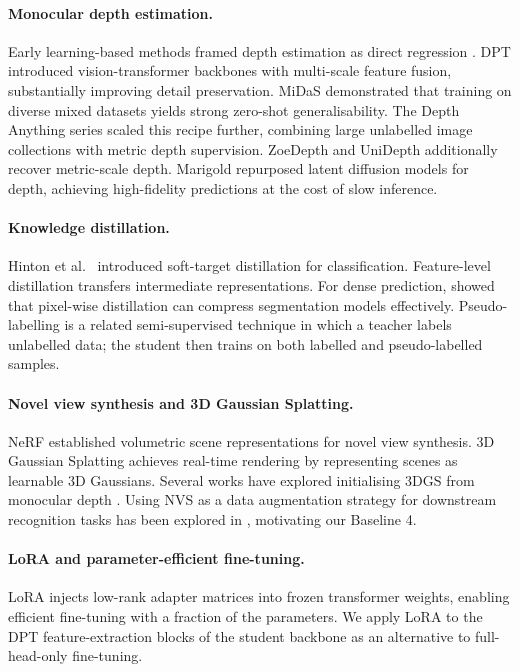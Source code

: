 \documentclass{article}
\begin{document}
\paragraph{Monocular depth estimation.}
Early learning-based methods framed depth estimation as direct regression \cite{TODO_eigen2014}.
DPT \cite{TODO_dpt} introduced vision-transformer backbones with multi-scale feature fusion, substantially improving detail preservation.
MiDaS \cite{TODO_midas} demonstrated that training on diverse mixed datasets yields strong zero-shot generalisability.
The Depth Anything series \cite{TODO_depthany_v1,TODO_depthany_v2,TODO_depthany_v3} scaled this recipe further, combining large unlabelled image collections with metric depth supervision.
ZoeDepth \cite{TODO_zoedepth} and UniDepth \cite{TODO_unidepth} additionally recover metric-scale depth.
Marigold \cite{TODO_marigold} repurposed latent diffusion models for depth, achieving high-fidelity predictions at the cost of slow inference.

\paragraph{Knowledge distillation.}
Hinton et al.\ \cite{TODO_hinton_kd} introduced soft-target distillation for classification.
Feature-level distillation \cite{TODO_fitnets,TODO_relationkd} transfers intermediate representations.
For dense prediction, \cite{TODO_dense_kd} showed that pixel-wise distillation can compress segmentation models effectively.
Pseudo-labelling \cite{TODO_pseudolabel,TODO_noisy_student} is a related semi-supervised technique in which a teacher labels unlabelled data; the student then trains on both labelled and pseudo-labelled samples.

\paragraph{Novel view synthesis and 3D Gaussian Splatting.}
NeRF \cite{TODO_nerf} established volumetric scene representations for novel view synthesis.
3D Gaussian Splatting \cite{TODO_3dgs} achieves real-time rendering by representing scenes as learnable 3D Gaussians.
Several works have explored initialising 3DGS from monocular depth \cite{TODO_depth_gs,TODO_monogs}.
Using NVS as a data augmentation strategy for downstream recognition tasks has been explored in \cite{TODO_nvs_aug}, motivating our Baseline 4.

\paragraph{LoRA and parameter-efficient fine-tuning.}
LoRA \cite{TODO_lora} injects low-rank adapter matrices into frozen transformer weights, enabling efficient fine-tuning with a fraction of the parameters.
We apply LoRA to the DPT feature-extraction blocks of the student backbone as an alternative to full-head-only fine-tuning.
\end{document}
